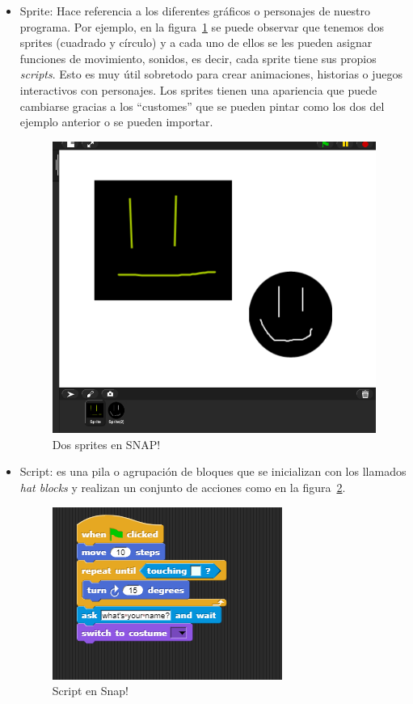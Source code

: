 \documentclass[a4paper, 12pt]{book}
\begin{document}
\begin{itemize}

	\item Sprite: Hace referencia a los diferentes gráficos o personajes de nuestro 		programa. Por ejemplo, en la figura~\ref{figura:sprites} se puede observar que tenemos 	dos sprites (cuadrado y círculo) y a cada uno de ellos se les pueden asignar funciones de 	movimiento, sonidos, es decir, cada sprite tiene sus propios \emph{scripts}. Esto es muy útil 	sobretodo para crear animaciones, historias o juegos interactivos con personajes. Los sprites tienen una apariencia que puede cambiarse gracias a los ``customes'' que se pueden pintar como los dos del ejemplo anterior o se pueden importar.

	    \begin{figure}[h]
		\centering
		\includegraphics[scale=0.3]{img/sprite.png}
		\caption{Dos sprites en SNAP!}
		\label{figura:sprites}
	    \end{figure}
	\item Script: es una pila o agrupación de bloques que se inicializan con los llamados 	\textit{hat blocks} y realizan un conjunto de acciones como en la 		figura~\ref{figura:script}. 
    
     \begin{figure}[h]
        \centering
        \includegraphics[scale=1]{img/script.PNG}
        \caption{Script en Snap!}
        \label{figura:script}
    \end{figure}
	    

\end{itemize}
\end{document}
